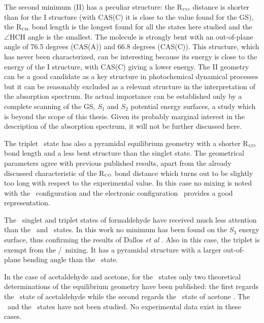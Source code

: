 The second minimum (II) has a peculiar structure: the R$_{\mbox{\tiny CO}}$ distance
is shorter than for the I structure (with CAS(C) it is close to the value
found for the GS), the R$_{\mbox{\tiny CH}}$ bond length is the longest found for all
the states here studied and the $\angle$HCH angle is the smallest. The
molecule is strongly bent with an out-of-plane angle of 76.5 degrees
(CAS(A)) and 66.8 degrees (CAS(C)).  This structure, which has never been
characterized, can be interesting because its energy is close to the energy
of the I structure, with CAS(C) giving a lower energy. 
The II geometry can be a good candidate as a key structure in
photochemical dynamical processes but it can be reasonably excluded as a
relevant structure in the interpretation of the absorption spectrum.  Its
actual importance can be established only by a complete scanning of the GS,
$S_1$ and $S_2$ potential energy surfaces, a study which is beyond the scope
of this thesis.  Given its probably marginal interest in the description of
the absorption spectrum, it will not be further discussed here.  

The triplet \pipi\ state has also a pyramidal equilibrium geometry with a
shorter R$_{\mbox{\tiny CO}}$ bond length and a less bent structure than the singlet
state.  The geometrical parameters agree with previous published results,
apart from the already discussed characteristic of the R$_{\mbox{\tiny CO}}$ bond
distance which turns out to be slightly too long with respect to the
experimental value.  In this case no mixing is noted with the \spi\   
configuration and the electronic configuration \pipi\  provides a good
representation.

The \spi\  singlet and triplet states of formaldehyde have received much less
attention than the \npi\  and \pipi\  states.  In this work no minimum has
been found on the $S_3$ energy surface, thus confirming the results of
Dallos {\it et al} \cite{jcp-114-746-2001}.  Also in this case, the triplet
is exempt from the \pipi/\spi\ mixing.  It has a pyramidal structure with a
larger out-of-plane bending angle than the \tpipi\ state.



In the case of acetaldehyde and acetone, for the \pipi\ states only two
theoretical determinations of the equilibrium geometry have been published:
the first regards the \spipi\ state of acetaldehyde \cite{jpc-97-4293-1993}
while the second regards the \spipi\ state of acetone \cite{cpc-3-57-2002}.
The \tpipi\ and the \spi\ states have not been studied. No experimental data
exist in these cases.

